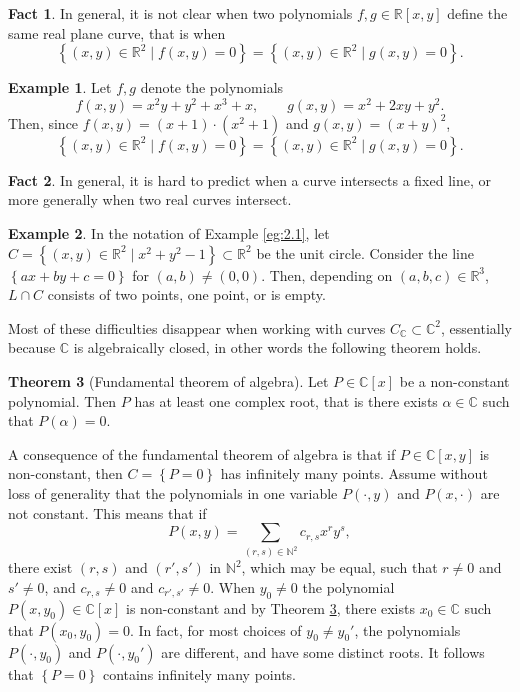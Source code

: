 \documentclass{article}
\newcommand{\N}{\mathbb{N}}
\newcommand{\R}{\mathbb{R}}
\newcommand{\C}{\mathbb{C}}
\newcommand{\rb}[1]{\left( #1 \right)}
\renewcommand{\sb}[1]{\left[ #1 \right]}
\newcommand{\cb}[1]{\left\{ #1 \right\}}
\theoremstyle{definition}\newtheorem{definition}{Definition}[section]
\theoremstyle{definition}\newtheorem{notation}[definition]{Notation}
\theoremstyle{definition}\newtheorem{remark}[definition]{Remark}
\theoremstyle{definition}\newtheorem{example}[definition]{Example}
\theoremstyle{definition}\newtheorem{fact}{Fact}
\theoremstyle{definition}\newtheorem{exercise}{Exercise}
\newtheorem{theorem}[definition]{Theorem}
\begin{document}
\begin{fact}
In general, it is not clear when two polynomials $ f, g \in \R\sb{x, y} $ define the same real plane curve, that is when
$$ \cb{\rb{x, y} \in \R^2 \mid f\rb{x, y} = 0} = \cb{\rb{x, y} \in \R^2 \mid g\rb{x, y} = 0}. $$
\end{fact}

\begin{example}
Let $ f, g $ denote the polynomials
$$ f\rb{x, y} = x^2y + y^2 + x^3 + x, \qquad g\rb{x, y} = x^2 + 2xy + y^2. $$
Then, since $ f\rb{x, y} = \rb{x + 1} \cdot \rb{x^2 + 1} $ and $ g\rb{x, y} = \rb{x + y}^2 $,
$$ \cb{\rb{x, y} \in \R^2 \mid f\rb{x, y} = 0} = \cb{\rb{x, y} \in \R^2 \mid g\rb{x, y} = 0}. $$
\end{example}

\begin{fact}
In general, it is hard to predict when a curve intersects a fixed line, or more generally when two real curves intersect.
\end{fact}

\begin{example}
In the notation of Example \ref{eg:2.1}, let $ C = \cb{\rb{x, y} \in \R^2 \mid x^2 + y^2 - 1} \subset \R^2 $ be the unit circle. Consider the line $ \cb{ax + by + c = 0} $ for $ \rb{a, b} \ne \rb{0, 0} $. Then, depending on $ \rb{a, b, c} \in \R^3 $, $ L \cap C $ consists of two points, one point, or is empty.
\end{example}

Most of these difficulties disappear when working with curves $ C_\C \subset \C^2 $, essentially because $ \C $ is algebraically closed, in other words the following theorem holds.

\begin{theorem}[Fundamental theorem of algebra]
\label{thm:2.4}
Let $ P \in \C\sb{x} $ be a non-constant polynomial. Then $ P $ has at least one complex root, that is there exists $ \alpha \in \C $ such that $ P\rb{\alpha} = 0 $.
\end{theorem}

A consequence of the fundamental theorem of algebra is that if $ P \in \C\sb{x, y} $ is non-constant, then $ C = \cb{P = 0} $ has infinitely many points. Assume without loss of generality that the polynomials in one variable $ P\rb{\cdot, y} $ and $ P\rb{x, \cdot} $ are not constant. This means that if
$$ P\rb{x, y} = \sum_{\rb{r, s} \in \N^2} c_{r, s}x^ry^s, $$
there exist $ \rb{r, s} $ and $ \rb{r', s'} $ in $ \N^2 $, which may be equal, such that $ r \ne 0 $ and $ s' \ne 0 $, and $ c_{r, s} \ne 0 $ and $ c_{r', s'} \ne 0 $. When $ y_0 \ne 0 $ the polynomial $ P\rb{x, y_0} \in \C\sb{x} $ is non-constant and by Theorem \ref{thm:2.4}, there exists $ x_0 \in \C $ such that $ P\rb{x_0, y_0} = 0 $. In fact, for most choices of $ y_0 \ne y_0' $, the polynomials $ P\rb{\cdot, y_0} $ and $ P\rb{\cdot, y_0'} $ are different, and have some distinct roots. It follows that $ \cb{P = 0} $ contains infinitely many points.
\end{document}
